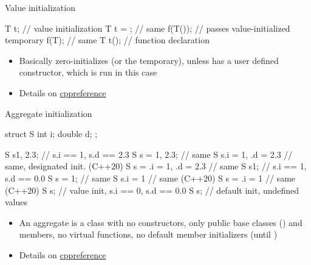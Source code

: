 \begin{frame}[fragile]
  \begin{block}{Value initialization}
    \begin{cppcode}
      T t{};    // value initialization
      T t = {}; // same
      f(T());   // passes value-initialized temporary
      f(T{});   // same
      T t();    // function declaration
    \end{cppcode}
    \begin{itemize}
      \item Basically zero-initializes  (or the temporary), unless  has a user defined constructor, which is run in this case
      \item Details on \href{https://en.cppreference.com/w/cpp/language/value_initialization}{cppreference}
    \end{itemize}
  \end{block}
\end{frame}

\begin{frame}[fragile,shrink=10]
  \begin{block}{Aggregate initialization}
    \begin{cppcode}
      struct S { int i; double d; };

      S s{1, 2.3};             // s.i == 1, s.d == 2.3
      S s = {1, 2.3};          // same
      S s{.i = 1, .d = 2.3}    // same, designated init. (C++20)
      S s = {.i = 1, .d = 2.3} // same
      S s{1};        // s.i == 1, s.d == 0.0
      S s = {1};     // same
      S s{.i = 1}    // same (C++20)
      S s = {.i = 1} // same (C++20)
      S s{}; // value init, s.i == 0, s.d == 0.0
      S s;   // default init, undefined values
    \end{cppcode}
    \begin{itemize}
      \item An aggregate is a class with no constructors, only public base classes () and members, no virtual functions, no default member initializers (until )
      \item Details on \href{https://en.cppreference.com/w/cpp/language/aggregate_initialization}{cppreference}
    \end{itemize}
  \end{block}
\end{frame}

